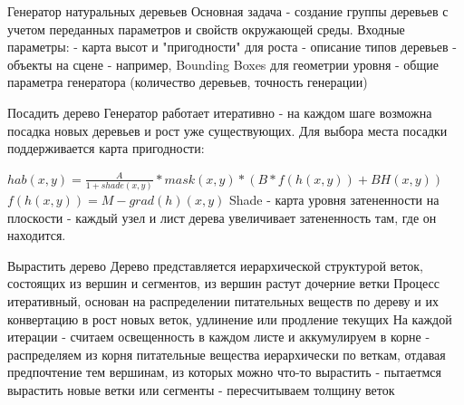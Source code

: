 \documentclass[11pt]{beamer}
\begin{document}
\begin{frame}{Генератор натуральных деревьев}
Основная задача - создание группы деревьев с учетом переданных параметров
и свойств окружающей среды.\linebreak\linebreak
Входные параметры:\linebreak
 - карта высот и "пригодности" для роста\linebreak
 - описание типов деревьев  \linebreak
 - объекты на сцене - например, Bounding Boxes для геометрии уровня\linebreak
 - общие параметра генератора (количество деревьев, точность генерации)\linebreak

\end{frame}
\begin{frame}{Посадить дерево}
Генератор работает итеративно - на каждом шаге возможна посадка новых деревьев и рост уже существующих. \linebreak
Для выбора места посадки поддерживается карта пригодности:\linebreak

$hab(x,y) = \frac{A}{1 + shade(x,y)}*mask(x,y)*(B*f(h(x,y)) + BH(x,y))$ 
$f(h(x,y)) = M - grad(h)(x,y)$
\linebreak\linebreak Shade - карта уровня затененности на плоскости - каждый узел и лист дерева увеличивает затененность там, где он находится.
\end{frame}
\begin{frame}{Вырастить дерево}
Дерево представляется иерархической структурой веток, состоящих из вершин и сегментов, из вершин растут дочерние ветки\linebreak 
Процесс итеративный, основан на распределении питательных веществ по дереву и их конвертацию в рост новых веток, удлинение или продление текущих\linebreak \linebreak 
На каждой итерации\linebreak 
- считаем освещенность в каждом листе и аккумулируем в корне\linebreak 
- распределяем из корня питательные вещества иерархически по веткам, отдавая предпочтение тем вершинам, из которых можно что-то вырастить
- пытаетмся вырастить новые ветки или сегменты\linebreak 
- пересчитываем толщину веток\linebreak 
\end{frame}
\end{document}
